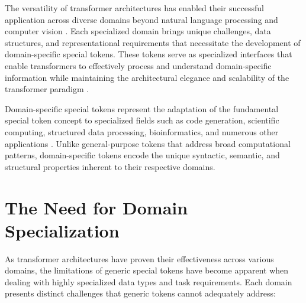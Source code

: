 
The versatility of transformer architectures has enabled their successful application across diverse domains beyond natural language processing and computer vision \citep{vaswani2017attention, devlin2018bert}. Each specialized domain brings unique challenges, data structures, and representational requirements that necessitate the development of domain-specific special tokens. These tokens serve as specialized interfaces that enable transformers to effectively process and understand domain-specific information while maintaining the architectural elegance and scalability of the transformer paradigm \citep{brown2020language, chowdhery2022palm}.
\begin{comment}
Feedback: This is a strong opening. To make it even more compelling, you could frame it as moving from generalist to specialist. For example: "Having established the general-purpose tokens that form the foundation of language and vision models, we now turn to the world of specialists. This chapter explores how the core ideas of special tokens are adapted to domains with their own unique languages and rules—from the rigid syntax of computer code to the complex hierarchies of structured databases."
\end{comment}

Domain-specific special tokens represent the adaptation of the fundamental special token concept to specialized fields such as code generation, scientific computing, structured data processing, bioinformatics, and numerous other applications \citep{chen2021evaluating, lewkowycz2022solving, yu2018spider}. Unlike general-purpose tokens that address broad computational patterns, domain-specific tokens encode the unique syntactic, semantic, and structural properties inherent to their respective domains.

\section{The Need for Domain Specialization}

As transformer architectures have proven their effectiveness across various domains, the limitations of generic special tokens have become apparent when dealing with highly specialized data types and task requirements. Each domain presents distinct challenges that generic tokens cannot adequately address:

